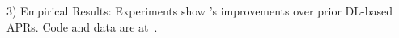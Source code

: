 

3) Empirical Results: 
Experiments show {\tool}'s improvements over prior
DL-based APRs. Code and data are at~\cite{CDFix2022}.







